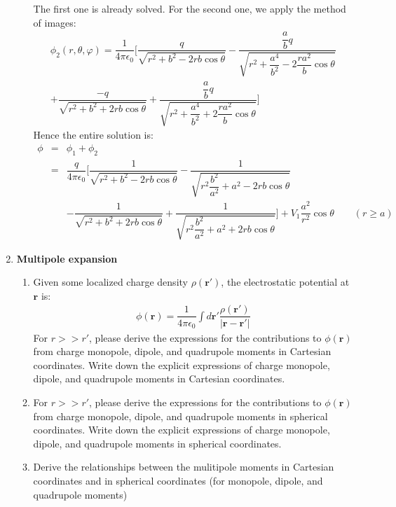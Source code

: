 \documentclass[a4paper,11pt]{article}
\begin{document}
\begin{enumerate}
\begin{enumerate}
        The first one is already solved. For the second one, we apply the method of images:
        \begin{eqnarray}
            \phi_2(r,\theta,\varphi)=\dfrac{1}{4\pi\epsilon_0}\Biggl[\dfrac{q}{\sqrt{r^2+b^2-2rb\cos\theta}}-\dfrac{\dfrac{a}{b}q}{\sqrt{r^2+\dfrac{a^4}{b^2}-2\dfrac{ra^2}{b}\cos\theta}} \nonumber \\
            +\dfrac{-q}{\sqrt{r^2+b^2+2rb\cos\theta}}+\dfrac{\dfrac{a}{b}q}{\sqrt{r^2+\dfrac{a^4}{b^2}+2\dfrac{ra^2}{b}\cos\theta}}\Biggr]
        \end{eqnarray}
        Hence the entire solution is:
        \begin{eqnarray}
            \phi&=&\phi_1+\phi_2\\
            &=&\dfrac{q}{4\pi\epsilon_0}\Biggl[\dfrac{1}{\sqrt{r^2+b^2-2rb\cos\theta}}-\dfrac{1}{\sqrt{r^2\dfrac{b^2}{a^2}+a^2-2rb\cos\theta}}\nonumber\\
            &&-\dfrac{1}{\sqrt{r^2+b^2+2rb\cos\theta}}+\dfrac{1}{\sqrt{r^2\dfrac{b^2}{a^2}+a^2+2rb\cos\theta}}\Biggr]+V_1\dfrac{a^2}{r^2}\cos\theta \quad\quad (r\geqslant a)
        \end{eqnarray}                            
    \end{enumerate}
    \item \textbf{Multipole expansion}
    \begin{enumerate}
        \item Given some localized charge density $\rho(\boldsymbol{r}')$, the electrostatic potential at $\boldsymbol{r}$ is:
        \begin{eqnarray}
            \phi(\boldsymbol{r})=\dfrac{1}{4\pi\epsilon_0}\int d\boldsymbol{r}'\dfrac{\rho(\boldsymbol{r}')}{|\boldsymbol{r}-\boldsymbol{r}'|}
        \end{eqnarray}
        For $r>>r'$, please derive the expressions for the contributions to $\phi(\boldsymbol{r})$ from charge monopole, dipole, and quadrupole moments in Cartesian coordinates. Write down the explicit expressions of charge monopole, dipole, and quadrupole moments in Cartesian coordinates.
        \item For $r>>r'$, please derive the expressions for the contributions to $\phi(\boldsymbol{r})$ from charge monopole, dipole, and quadrupole moments in spherical coordinates. Write down the explicit expressions of charge monopole, dipole, and quadrupole moments in spherical coordinates.
        \item Derive the relationships between the mulitipole moments in Cartesian coordinates and in spherical coordinates (for monopole, dipole, and quadrupole moments)

\end{enumerate}
\end{enumerate}
\end{document}
